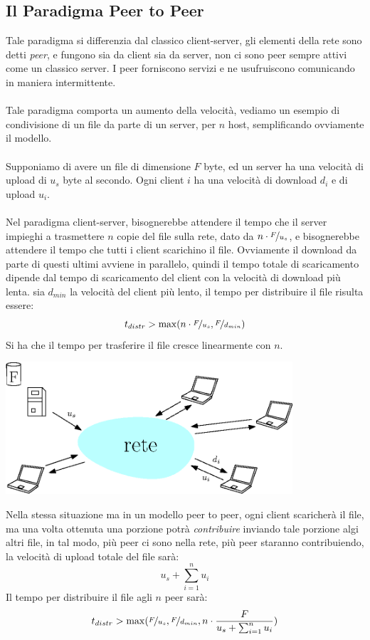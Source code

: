 \documentclass[12pt, letterpaper]{article}
\newcommand{\acc}{\\\hphantom{}\\}
\begin{document}
\subsection{Il Paradigma Peer to Peer}
Tale paradigma si differenzia dal classico client-server, gli elementi della rete sono detti \textit{peer},
e fungono sia da client sia da server, non ci sono peer sempre attivi come un classico server. I peer forniscono
servizi e ne usufruiscono comunicando in maniera intermittente.\acc
Tale paradigma comporta un aumento della velocità, vediamo un esempio di condivisione di un file da
parte di un server, per $n$ host, semplificando ovviamente il modello. \acc
Supponiamo di avere un file di dimensione $F$ byte, ed un server ha una velocità di upload di $u_s$ byte
al secondo. Ogni client $i$ ha una velocità di download $d_i$ e di upload  $u_i$.\acc
Nel paradigma client-server, bisognerebbe attendere il tempo che il server impieghi a trasmettere $n$
copie del file
sulla rete, dato da $n\cdot\nicefrac{ F}{u_s}$, e bisognerebbe attendere il tempo che tutti i client scarichino il
file. Ovviamente il download da parte di questi ultimi avviene in parallelo, quindi il tempo totale di scaricamento
dipende dal tempo di scaricamento del client con la velocità di download più lenta. sia $d_{min}$ la velocità
del client più lento, il tempo per distribuire il file risulta essere:
$$t_{distr}>\max(n\cdot\nicefrac{ F}{u_s},\nicefrac{F}{d_{min}} )$$
Si ha che il tempo per trasferire il file cresce linearmente con $n$.
\begin{center}
    \includegraphics[width=0.8\textwidth ]{images/nFile.eps}
\end{center}
Nella stessa situazione ma in un modello peer to peer, ogni client scaricherà il file, ma
una volta ottenuta una porzione potrà \textit{contribuire} inviando tale porzione algi altri file, in tal modo,
più peer ci sono nella rete, più peer staranno contribuiendo, la velocità di upload totale del file
sarà: $$\displaystyle u_s +\sum_{i=1}^n u_i$$
Il tempo per distribuire il file agli $n$ peer sarà:$$
    t_{distr}>\max(\nicefrac{ F}{u_s},\nicefrac{ F}{d_{min}},n\cdot \dfrac{F}{u_s +\sum_{i=1}^n u_i})
$$
\end{document}
